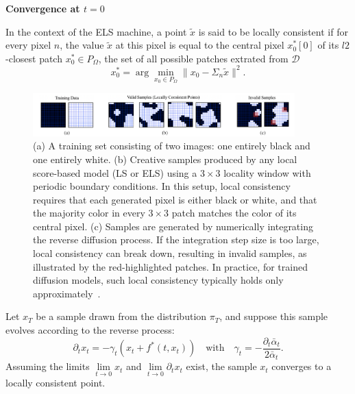 \documentclass[a4paper,10pt]{article}
\begin{document}
\noindent
{\textbf{Convergence at $t = 0$}}
\begin{definition}
    In the context of the ELS machine, a point $\tilde{x}$ is said to be locally consistent if 
    for every pixel $n$, the value $\tilde{x}$ at this pixel is equal to the central pixel $x_0^*[0]$ of its $l2$-closest patch $x_0^* \in P_\Omega$, the set of all possible patches extrated from $\mathcal{D}$
    \[
        x_0^* = \arg \min_{x_0 \in P_{\Omega}} \|x_0 - \Sigma_n \tilde{x}\|^2.
    \]
\end{definition}
\begin{figure}[ht] %
    \centering
    \includegraphics[width=0.9\textwidth]{../images/locally_consistent_point.png} %
\caption{
(a) A training set consisting of two images: one entirely black and one entirely white. 
(b) Creative samples produced by any local score-based model (LS or ELS) using a \(3 \times 3\) locality window with periodic boundary conditions. In this setup, local consistency requires that each generated pixel is either black or white, and that the majority color in every \(3 \times 3\) patch matches the color of its central pixel. 
(c) Samples are generated by numerically integrating the reverse diffusion process. If the integration step size is too large, local consistency can break down, resulting in invalid samples, as illustrated by the red-highlighted patches. In practice, for trained diffusion models, such local consistency typically holds only approximately~\cite{kamb2024analytictheorycreativityconvolutional}.
}   
\label{fig:local_consistency}
\end{figure}

\begin{theorem}
    Let \(x_T\) be a sample drawn from the distribution \(\pi_T\), and suppose this sample evolves according to the reverse process:
    \[
        \partial_t x_t = - \gamma_t \left( x_t + f^*(t,x_t) \right) \quad \text{with} \quad \gamma_t = -\frac{\partial_t \bar{\alpha}_t}{2 \bar \alpha_t}.
    \]
    Assuming the limits \( \lim\limits_{t \to 0} x_t \) and \( \lim\limits_{t \to 0} \partial_t x_t \) exist, the sample \( x_t \) converges to a locally consistent point.
\end{theorem}
\end{document}

